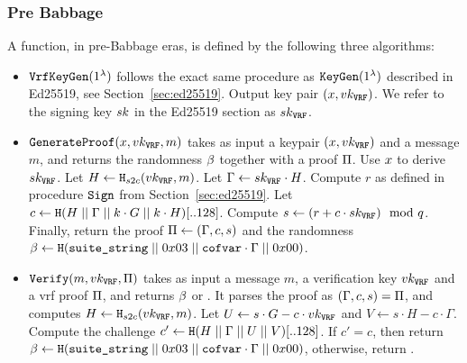 \subsubsection{Pre Babbage}
A \vrf function, in pre-Babbage eras, is defined by the following three algorithms:
\begin{itemize}
    \item $\texttt{VrfKeyGen}(1^\lambda)$ follows the exact same procedure as $\texttt{KeyGen}(1^\lambda)$ described in Ed25519,
    see Section~\ref{sec:ed25519}. Output key pair $(x, vk_{\texttt{VRF}})$. We refer to the signing key
    $sk$ in the Ed25519 section as $sk_{\texttt{VRF}}$.
    \item $\texttt{GenerateProof}(x, vk_{\texttt{VRF}}, m)$ takes as input a keypair $(x, vk_{\texttt{VRF}})$ and a message
    $m$, and returns the \vrf randomness $\beta$ together with a proof $\Pi$. Use $x$ to
    derive $sk_{\texttt{VRF}}$. Let $H \gets \texttt{H}_{s2c}(vk_{\texttt{VRF}}, m)$. Let $\Gamma \gets sk_{\texttt{VRF}}\cdot H$. Compute $r$ as
    defined in procedure $\texttt{Sign}$ from Section~\ref{sec:ed25519}. Let $c \gets \texttt{H}
    (H\;||\;\Gamma\;||\; k\cdot G\;||\; k\cdot H)[..128]$. Compute $s \gets (r +
    c\cdot sk_{\texttt{VRF}})\mod{q}$. Finally, return the proof $\Pi \gets (\Gamma, c, s)$ and the randomness
    $\beta \gets \texttt{H}(\texttt{suite\_string}\;||\; 0x03\;||\;\texttt{cofvar}\cdot\Gamma\;||\;
    0x00)$.
    \item $\texttt{Verify}(m, vk_{\texttt{VRF}}, \Pi)$ takes as input a message $m$, a verification key $vk_{\texttt{VRF}}$ and a vrf proof
    $\Pi$, and returns $\beta$ or \false. It parses the proof as $(\Gamma, c, s) = \Pi$, and
    computes $H\gets\texttt{H}_{s2c}(vk_{\texttt{VRF}}, m)$. Let $U \gets s\cdot G - c\cdot vk_{\texttt{VRF}}$ and $V \gets s\cdot
    H - c\cdot\Gamma$. Compute the challenge $c'\gets\texttt{H}(H\;||\;\Gamma\;||\; U\;||\; V)[..128]$.
    If $c'=c$, then return $\beta \gets  \texttt{H}(\texttt{suite\_string}\;||\;
    0x03\;||\;\texttt{cofvar}\cdot\Gamma\;||\; 0x00)$, otherwise, return \false.
\end{itemize}

